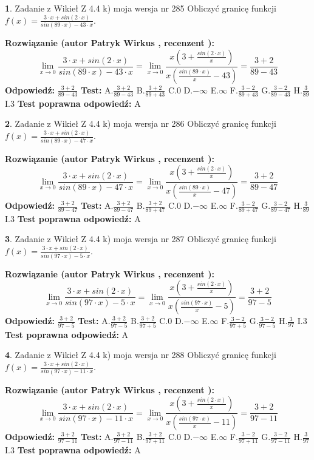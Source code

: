 \documentclass[12pt, a4paper]{article}
\theoremstyle{definition} %
\newtheorem{zad}{}
\newcommand{\zadStart}[1]{\begin{zad}#1\newline}
\newcommand{\zadStop}{\end{zad}}
\newcommand{\rozwStart}[2]{\noindent \textbf{Rozwiązanie (autor #1 , recenzent #2): }\newline}
\newcommand{\rozwStop}{\newline}
\newcommand{\odpStart}{\noindent \textbf{Odpowiedź:}\newline}
\newcommand{\odpStop}{\newline}
\newcommand{\testStart}{\noindent \textbf{Test:}\newline}
\newcommand{\testStop}{\newline}
\newcommand{\kluczStart}{\noindent \textbf{Test poprawna odpowiedź:}\newline}
\newcommand{\kluczStop}{\newline}
\begin{document}
\zadStart{Zadanie z Wikieł Z 4.4 k) moja wersja nr 285}
Obliczyć granicę funkcji $f(x)=\frac{3\cdot x +sin(2\cdot x)}{sin(89\cdot x) -43\cdot x}$.
\zadStop
\rozwStart{Patryk Wirkus}{}
$$\lim\limits_{x\to 0}\frac{3\cdot x +sin(2\cdot x)}{sin(89\cdot x) -43\cdot x}
=\lim\limits_{x\to 0}\frac{x(3+\frac{sin(2\cdot x)}{x})}{x(\frac{sin(89\cdot x)}{x}-43)}
=\frac{3+2}{89-43}$$
\rozwStop
\odpStart
$\frac{3+2}{89-43}$
\odpStop
\testStart
A.$\frac{3+2}{89-43}$
B.$\frac{3+2}{89+43}$
C.$0$
D.$-\infty$
E.$\infty$
F.$\frac{3-2}{89+43}$
G.$\frac{3-2}{89-43}$
H.$\frac{3}{89}$
I.$3$
\testStop
\kluczStart
A
\kluczStop



\zadStart{Zadanie z Wikieł Z 4.4 k) moja wersja nr 286}
Obliczyć granicę funkcji $f(x)=\frac{3\cdot x +sin(2\cdot x)}{sin(89\cdot x) -47\cdot x}$.
\zadStop
\rozwStart{Patryk Wirkus}{}
$$\lim\limits_{x\to 0}\frac{3\cdot x +sin(2\cdot x)}{sin(89\cdot x) -47\cdot x}
=\lim\limits_{x\to 0}\frac{x(3+\frac{sin(2\cdot x)}{x})}{x(\frac{sin(89\cdot x)}{x}-47)}
=\frac{3+2}{89-47}$$
\rozwStop
\odpStart
$\frac{3+2}{89-47}$
\odpStop
\testStart
A.$\frac{3+2}{89-47}$
B.$\frac{3+2}{89+47}$
C.$0$
D.$-\infty$
E.$\infty$
F.$\frac{3-2}{89+47}$
G.$\frac{3-2}{89-47}$
H.$\frac{3}{89}$
I.$3$
\testStop
\kluczStart
A
\kluczStop



\zadStart{Zadanie z Wikieł Z 4.4 k) moja wersja nr 287}
Obliczyć granicę funkcji $f(x)=\frac{3\cdot x +sin(2\cdot x)}{sin(97\cdot x) -5\cdot x}$.
\zadStop
\rozwStart{Patryk Wirkus}{}
$$\lim\limits_{x\to 0}\frac{3\cdot x +sin(2\cdot x)}{sin(97\cdot x) -5\cdot x}
=\lim\limits_{x\to 0}\frac{x(3+\frac{sin(2\cdot x)}{x})}{x(\frac{sin(97\cdot x)}{x}-5)}
=\frac{3+2}{97-5}$$
\rozwStop
\odpStart
$\frac{3+2}{97-5}$
\odpStop
\testStart
A.$\frac{3+2}{97-5}$
B.$\frac{3+2}{97+5}$
C.$0$
D.$-\infty$
E.$\infty$
F.$\frac{3-2}{97+5}$
G.$\frac{3-2}{97-5}$
H.$\frac{3}{97}$
I.$3$
\testStop
\kluczStart
A
\kluczStop



\zadStart{Zadanie z Wikieł Z 4.4 k) moja wersja nr 288}
Obliczyć granicę funkcji $f(x)=\frac{3\cdot x +sin(2\cdot x)}{sin(97\cdot x) -11\cdot x}$.
\zadStop
\rozwStart{Patryk Wirkus}{}
$$\lim\limits_{x\to 0}\frac{3\cdot x +sin(2\cdot x)}{sin(97\cdot x) -11\cdot x}
=\lim\limits_{x\to 0}\frac{x(3+\frac{sin(2\cdot x)}{x})}{x(\frac{sin(97\cdot x)}{x}-11)}
=\frac{3+2}{97-11}$$
\rozwStop
\odpStart
$\frac{3+2}{97-11}$
\odpStop
\testStart
A.$\frac{3+2}{97-11}$
B.$\frac{3+2}{97+11}$
C.$0$
D.$-\infty$
E.$\infty$
F.$\frac{3-2}{97+11}$
G.$\frac{3-2}{97-11}$
H.$\frac{3}{97}$
I.$3$
\testStop
\kluczStart
A
\kluczStop
\end{document}
